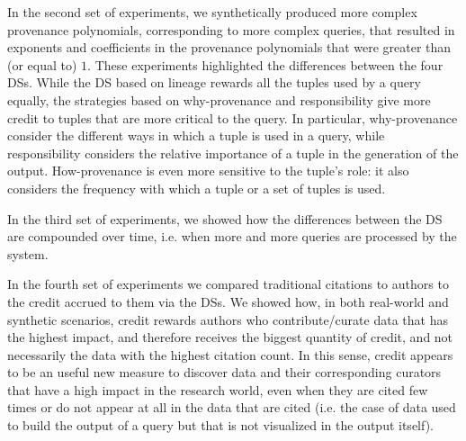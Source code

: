 In the second set of experiments, we synthetically produced more complex provenance polynomials, corresponding to more complex queries, that resulted in exponents and coefficients in the provenance polynomials that were greater than (or equal to) $1$.
These experiments highlighted the differences between the four DSs.
While the DS based on lineage rewards all the tuples used by a query equally, the strategies based on why-provenance and responsibility give more credit to  tuples that are more critical to the query. 
In particular, why-provenance consider the different ways in which a tuple is used in a query, while responsibility considers the relative importance of a tuple in the generation of the output.  
How-provenance is even more sensitive to the tuple's role: it also considers the frequency with which a tuple or a set of tuples is used. %

In the third set of experiments, we showed how the differences between the DS are compounded over time, i.e. when more and more queries are processed by the system.

In the fourth set of experiments we compared traditional citations to authors to the credit accrued to them via the DSs. We showed how, in both real-world and synthetic scenarios, credit rewards authors 
who contribute/curate data that has the highest impact, and therefore receives the biggest quantity of credit, and not necessarily the data with the highest citation count. 
In this sense, credit appears to be an useful new measure to discover data and their corresponding curators that have a high impact in the research world, even when they are cited few times or do not appear at all in the data that are cited (i.e. the case of data used to build the output of a query but that is not visualized in the output itself).

 

